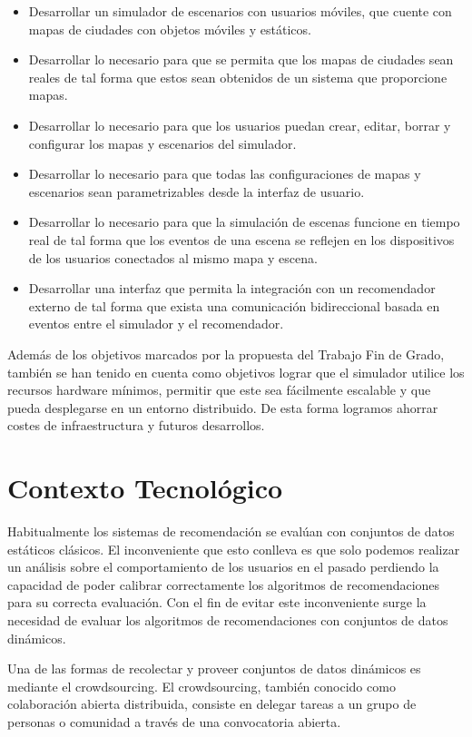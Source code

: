 \begin{itemize}
       \item Desarrollar un simulador de escenarios con usuarios móviles, que cuente con mapas de ciudades con objetos móviles y estáticos.
       \item Desarrollar lo necesario para que se permita que los mapas de ciudades sean reales de tal forma que estos sean obtenidos de un sistema que proporcione mapas.
       \item Desarrollar lo necesario para que los usuarios puedan crear, editar, borrar y configurar los mapas y escenarios del simulador.
       \item Desarrollar lo necesario para que todas las configuraciones de mapas y escenarios sean parametrizables desde la interfaz de usuario.
       \item Desarrollar lo necesario para que la simulación de escenas funcione en tiempo real de tal forma que los eventos de una escena se reflejen en los dispositivos de los usuarios conectados al mismo mapa y escena.
       \item Desarrollar una interfaz que permita la integración con un recomendador externo de tal forma que exista una comunicación bidireccional basada en eventos entre el simulador y el recomendador.
\end{itemize}

Además de los objetivos marcados por la propuesta del Trabajo Fin de Grado, también se han tenido en cuenta como objetivos lograr que el simulador utilice los recursos hardware mínimos, permitir que este sea fácilmente escalable y que pueda desplegarse en un entorno distribuido. De esta forma logramos ahorrar costes de infraestructura y futuros desarrollos.

\section{Contexto Tecnológico}

Habitualmente los sistemas de recomendación se evalúan con conjuntos de datos estáticos clásicos. El inconveniente que esto conlleva es que solo podemos realizar un análisis sobre el comportamiento de los usuarios en el pasado perdiendo la capacidad de poder calibrar correctamente los algoritmos de recomendaciones para su correcta evaluación. Con el fin de evitar este inconveniente surge la necesidad de evaluar los algoritmos de recomendaciones con conjuntos de datos dinámicos. 

Una de las formas de recolectar y proveer conjuntos de datos dinámicos es mediante el crowdsourcing. El crowdsourcing, también conocido como colaboración abierta distribuida, consiste en delegar tareas a un grupo de personas o comunidad a través de una convocatoria abierta. 


